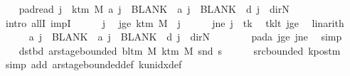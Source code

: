 \begin{isabellebody}
\ \ \isamarkupfalse%
\ pad{\isacharunderscore}{\kern0pt}read{\isacharcolon}{\kern0pt}\ {\isachardoublequoteopen}{\isasymforall}j\ {\isasymge}\ k{\isacharunderscore}{\kern0pt}tm\ M{\isachardot}{\kern0pt}\ {\isacharquery}{\kern0pt}a\ j\ {\isacharequal}{\kern0pt}\ BLANK{}\ {\isasymand}\ {\isacharquery}{\kern0pt}a{\isacharprime}{\kern0pt}\ j\ {\isacharequal}{\kern0pt}\ BLANK{}\ {\isasymand}\ {\isacharquery}{\kern0pt}d\ j\ {\isacharequal}{\kern0pt}\ dir{\isachardot}{\kern0pt}N{\isachardoublequoteclose}\isanewline
\ \ \isamarkupfalse%
\ {\isacharparenleft}{\kern0pt}intro\ allI\ impI{\isacharparenright}{\kern0pt}\isanewline
\ \ \ \ \isamarkupfalse%
\ j\ \isamarkupfalse%
\ jge{\isacharcolon}{\kern0pt}\ {\isachardoublequoteopen}k{\isacharunderscore}{\kern0pt}tm\ M\ {\isasymle}\ j{\isachardoublequoteclose}\isanewline
\ \ \ \ \isamarkupfalse%
\ jne{\isacharcolon}{\kern0pt}\ {\isachardoublequoteopen}j\ {\isasymnoteq}\ tk{\isachardoublequoteclose}\ \isamarkupfalse%
\ tk{\isacharunderscore}{\kern0pt}lt\ jge\ \isamarkupfalse%
\ linarith\isanewline
\ \ \ \ \isamarkupfalse%
\ {\isachardoublequoteopen}{\isacharquery}{\kern0pt}a\ j\ {\isacharequal}{\kern0pt}\ BLANK{}\ {\isasymand}\ {\isacharquery}{\kern0pt}a{\isacharprime}{\kern0pt}\ j\ {\isacharequal}{\kern0pt}\ BLANK{}\ {\isasymand}\ {\isacharquery}{\kern0pt}d\ j\ {\isacharequal}{\kern0pt}\ dir{\isachardot}{\kern0pt}N{\isachardoublequoteclose}\isanewline
\ \ \ \ \ \ \isamarkupfalse%
\ pad{\isacharunderscore}{\kern0pt}a\ jge\ jne\ \isamarkupfalse%
\ simp\isanewline
\ \ \isamarkupfalse%
\isanewline
\ \ \isamarkupfalse%
\ dst{\isacharunderscore}{\kern0pt}bd{\isacharcolon}{\kern0pt}\ {\isachardoublequoteopen}ar{\isacharunderscore}{\kern0pt}stage{\isacharunderscore}{\kern0pt}bounded\ {\isacharparenleft}{\kern0pt}bl{\isacharunderscore}{\kern0pt}tm\ M{\isacharparenright}{\kern0pt}\ {\isacharparenleft}{\kern0pt}k{\isacharunderscore}{\kern0pt}tm\ M{\isacharparenright}{\kern0pt}\ {\isacharparenleft}{\kern0pt}snd\ {\isacharquery}{\kern0pt}s{\isacharprime}{\kern0pt}{\isacharparenright}{\kern0pt}{\isachardoublequoteclose}\isanewline
\ \ \ \ \isamarkupfalse%
\ src{\isacharunderscore}{\kern0pt}bounded\ kpos{\isacharunderscore}{\kern0pt}tm\ \isamarkupfalse%
\ {\isacharparenleft}{\kern0pt}simp\ add{\isacharcolon}{\kern0pt}\ ar{\isacharunderscore}{\kern0pt}stage{\isacharunderscore}{\kern0pt}bounded{\isacharunderscore}{\kern0pt}def\ k{\isacharunderscore}{\kern0pt}unidx{\isacharunderscore}{\kern0pt}def{\isacharparenright}{\kern0pt}\isanewline

\end{isabellebody}
